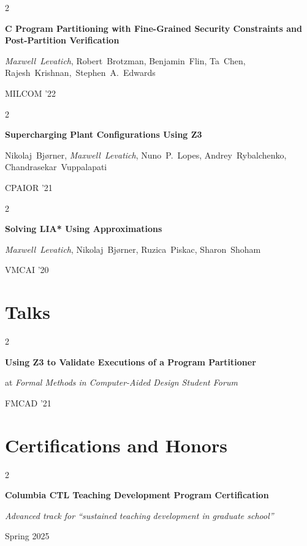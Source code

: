 \documentclass[10pt, letterpaper]{article}
\newenvironment{twocolentry}[2][]{
    \onecolentry
    \def\secondColumn{#2}
    \setcolumnwidth{\fill, 5.5 cm}
    \begin{paracol}{2}
}{
    \switchcolumn \raggedleft \secondColumn
    \end{paracol}
    \endonecolentry
} %
\begin{document}
        \vspace{0.4 cm}
        
        \begin{twocolentry}{MILCOM '22}
            \textbf{C Program Partitioning with Fine-Grained Security Constraints and Post-Partition Verification}

            \mbox{{\textit{Maxwell Levatich}}}, \mbox{Robert Brotzman}, \mbox{Benjamin Flin}, \mbox{Ta Chen}, \mbox{Rajesh Krishnan, Stephen A. Edwards}
        \end{twocolentry}

        \begin{twocolentry}{CPAIOR '21}
            \textbf{Supercharging Plant Configurations Using Z3}

            \mbox{Nikolaj Bjørner}, \mbox{{\textit{Maxwell Levatich}}}, \mbox{Nuno P. Lopes}, \mbox{Andrey Rybalchenko}, \mbox{Chandrasekar Vuppalapati}
        \end{twocolentry}

        \begin{twocolentry}{VMCAI '20}
            \textbf{Solving LIA* Using Approximations}

            \mbox{{\textit{Maxwell Levatich}}}, \mbox{Nikolaj Bjørner}, \mbox{Ruzica Piskac}, \mbox{Sharon Shoham}
        \end{twocolentry}

    \section{Talks}
        
        \begin{twocolentry}{FMCAD '21}
            \textbf{Using Z3 to Validate Executions of a Program Partitioner}

            at \textit{Formal Methods in Computer-Aided Design Student Forum}
        \end{twocolentry}

    \section{Certifications and Honors}
        
        \begin{twocolentry}{Spring 2025}
            \textbf{Columbia CTL Teaching Development Program Certification}

            \textit{Advanced track for ``sustained teaching development in graduate school''}
        \end{twocolentry}
\end{document}
